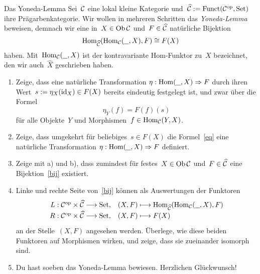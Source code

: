 \documentclass{pizzablatt}
\begin{document}

\begin{aufgabe}{Das Yoneda-Lemma}
Sei~$\mathcal{C}$ eine lokal kleine Kategorie und~$\widehat {\mathcal{C}} := \mathrm{Funct}(\mathcal{C}^{\mathrm{op}},\mathrm{Set})$
ihre Prägarbenkategorie. Wir wollen in mehreren Schritten das \emph{Yoneda-Lemma}
beweisen, demnach wir eine in~$X \in \operatorname{Ob} \mathcal{C}$ und~$F \in \widehat {\mathcal{C}}$
natürliche Bijektion
\begin{equation}\label{bij}\mathrm{Hom}_{\widehat{\mathcal{C}}}(\mathrm{Hom}_{\mathcal{C}}(\underline{\ \ }, X), F) \cong F(X)
\end{equation}
haben. Mit~$\mathrm{Hom}_{\mathcal{C}}(\underline{\ \ },X)$ ist der kontravariante Hom-Funktor zu~$X$
bezeichnet, den wir auch~$\widehat X$ geschrieben haben.
\begin{enumerate}
\item Zeige, dass eine natürliche Transformation $\eta : \mathrm{Hom}(\underline{\ \ }, X)
\Rightarrow F$ durch ihren Wert~$s := \eta_X(\mathrm{id}_X) \in F(X)$ bereits eindeutig
festgelegt ist, und zwar über die Formel
\begin{equation}\label{eq} \eta_Y(f) = F(f)(s) \end{equation}
für alle Objekte~$Y$ und Morphismen~$f \in \mathrm{Hom}_{\mathcal{C}}(Y,X)$.
\item Zeige, dass umgekehrt für beliebiges~$s \in F(X)$ die Formel~\eqref{eq} eine
natürliche Transformation $\eta : \mathrm{Hom}(\underline{\ \ }, X) \Rightarrow F$ definiert.
\item Zeige mit a) und b), dass zumindest für festes~$X \in \operatorname{Ob}\mathcal{C}$ und~$F \in
\widehat{\mathcal{C}}$ eine Bijektion~\eqref{bij} existiert.
\item Linke und rechte Seite von~\eqref{bij} können als Auswertungen der
Funktoren
\[ \renewcommand{\arraystretch}{1.3}\begin{array}{@{}rl@{}}
  L : \C^\op \times \widehat\C \longrightarrow \Set, &
  (X,F) \longmapsto \Hom_{\widehat\C}(\Hom_\C(\freist,X), F)
  \\
  R : \C^\op \times \widehat\C \longrightarrow \Set, &
  (X,F) \longmapsto F(X)
\end{array} \]
an der Stelle~$(X,F)$ angesehen werden. Überlege, wie diese beiden Funktoren auf
Morphismen wirken, und zeige, dass sie zueinander isomorph sind.
\item Du hast soeben das Yoneda-Lemma bewiesen. Herzlichen Glückwunsch!
\end{enumerate}
\end{aufgabe}
\end{document}
